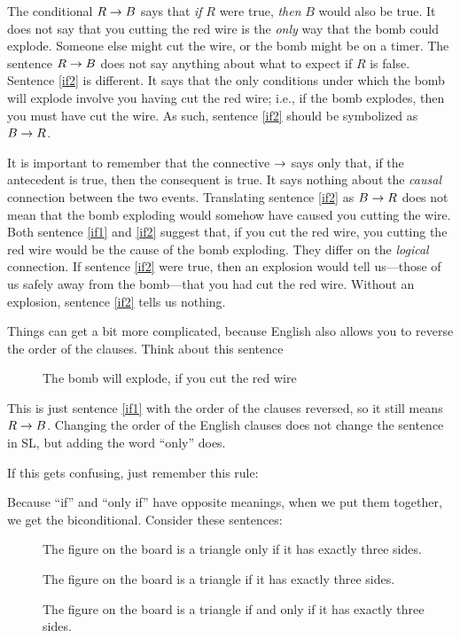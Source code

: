 The conditional $R\mathrel{\rightarrow} B$ says that \emph{if} $R$ were true, \emph{then} $B$ would also be true. It does not say that you cutting the red wire is the \emph{only} way that the bomb could explode. Someone else might cut the wire, or the bomb might be on a timer. The sentence $R\mathrel{\rightarrow} B$ does not say anything about what to expect if $R$ is false. Sentence \ref{if2} is different. It says that the only conditions under which the bomb will explode involve you having cut the red wire; i.e., if the bomb explodes, then you must have cut the wire. As such, sentence \ref{if2} should be symbolized as $B \mathrel{\rightarrow} R$.

It is important to remember that the connective $\mathrel{\rightarrow}$ says only that, if the antecedent is true, then the consequent is true. It says nothing about the \emph{causal} connection between the two events. Translating sentence \ref{if2} as $B \mathrel{\rightarrow} R$ does not mean that the bomb exploding would somehow have caused you cutting the wire. Both sentence \ref{if1} and \ref{if2} suggest that, if you cut the red wire, you cutting the red wire would be the cause of the bomb exploding. They differ on the \emph{logical} connection. If sentence \ref{if2} were true, then an explosion would tell us---those of us safely away from the bomb---that you had cut the red wire. Without an explosion, sentence \ref{if2} tells us nothing.

Things can get a bit more complicated, because English also allows you to reverse the order of the clauses. Think about this sentence

\begin{description}
\item[] The bomb will explode, if you cut the red wire
\end{description}

This is just sentence \ref{if1} with the order of the clauses reversed, so it still means $R \mathrel{\rightarrow} B$. Changing the order of the English clauses does not change the sentence in SL, but adding the word ``only'' does.

If this gets confusing, just remember this rule:

Because ``if'' and ``only if'' have opposite meanings, when we put them together, we get the biconditional. Consider these sentences:
\begin{description}
\item[] The figure on the board is a triangle only if it has exactly three sides.
\item[] The figure on the board is a triangle if it has exactly three sides.
\item[] The figure on the board is a triangle if and only if it has exactly three sides.
\end{description}


